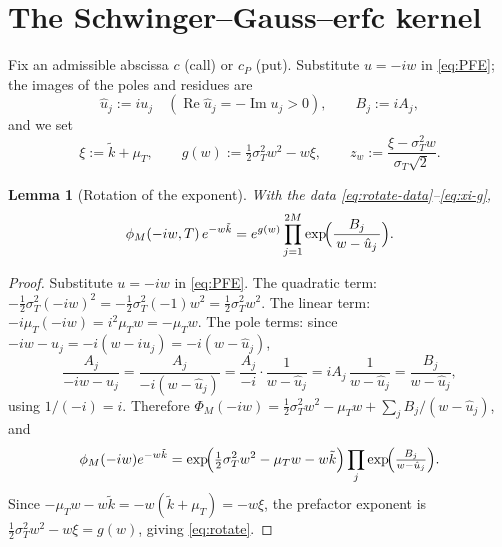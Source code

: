 \documentclass[11pt]{article}
\newtheorem{lemma}[theorem]{Lemma}
\DeclareMathOperator{\Real}{Re}
\DeclareMathOperator{\Imag}{Im}
\begin{document}
\section{The Schwinger--Gauss--erfc kernel}\label{sec:kernel}

Fix an admissible abscissa $c$ (call) or $c_P$ (put). Substitute $u=-iw$ in
\eqref{eq:PFE}; the images of the poles and residues are
\begin{equation}\label{eq:rotate-data}
\hat u_j:=i u_j\quad(\Real\hat u_j=-\Imag u_j>0),\qquad B_j:=i A_j,
\end{equation}
and we set
\begin{equation}\label{eq:xi-g}
\xi:=\tilde k+\mu_T,\qquad g(w):=\tfrac12\sigma_T^2 w^2-w\xi,\qquad
z_w:=\frac{\xi-\sigma_T^2 w}{\sigma_T\sqrt2}.
\end{equation}

\begin{lemma}[Rotation of the exponent]\label{lem:rotate}
With the data \eqref{eq:rotate-data}--\eqref{eq:xi-g},
\begin{equation}\label{eq:rotate}
\phi_M(-iw,T)\,e^{-w\tilde k}
=e^{g(w)}\prod_{j=1}^{2M}\exp\!\Bigl(\frac{B_j}{\,w-\hat u_j\,}\Bigr).
\end{equation}
\end{lemma}

\begin{proof}
Substitute $u=-iw$ in \eqref{eq:PFE}. The quadratic term:
$-\tfrac12\sigma_T^2(-iw)^2=-\tfrac12\sigma_T^2(-1)w^2=\tfrac12\sigma_T^2w^2$.
The linear term: $-i\mu_T(-iw)=i^2\mu_T w=-\mu_T w$. The pole terms: since
$-iw-u_j=-i(w-iu_j)=-i(w-\hat u_j)$,
\begin{equation}\label{eq:rotate-pf}
\frac{A_j}{-iw-u_j}=\frac{A_j}{-i(w-\hat u_j)}
=\frac{A_j}{-i}\cdot\frac{1}{w-\hat u_j}
=iA_j\,\frac{1}{w-\hat u_j}=\frac{B_j}{w-\hat u_j},
\end{equation}
using $1/(-i)=i$. Therefore
$\Phi_M(-iw)=\tfrac12\sigma_T^2w^2-\mu_T w+\sum_jB_j/(w-\hat u_j)$, and
\begin{equation}\label{eq:rotate-pf2}
\phi_M(-iw)e^{-w\tilde k}
=\exp\!\Bigl(\tfrac12\sigma_T^2w^2-\mu_T w-w\tilde k\Bigr)
\prod_j\exp\!\Bigl(\tfrac{B_j}{w-\hat u_j}\Bigr).
\end{equation}
Since $-\mu_T w-w\tilde k=-w(\tilde k+\mu_T)=-w\xi$, the prefactor exponent
is $\tfrac12\sigma_T^2w^2-w\xi=g(w)$, giving \eqref{eq:rotate}.
\end{proof}
\end{document}
